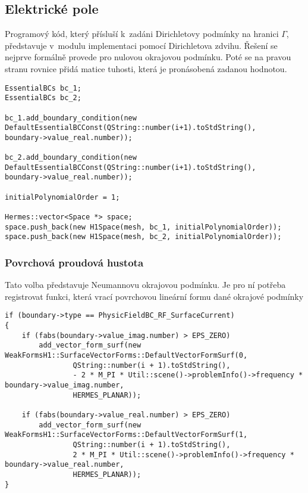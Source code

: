 \subsection*{Elektrické pole}
Programový kód, který přísluší k~zadáni Dirichletovy podmínky na hranici $\Gamma$, představuje v~modulu implementaci pomocí Dirichletova zdvihu.
Řešení se nejprve formálně provede pro nulovou okrajovou podmínku. Poté se na pravou stranu rovnice přidá matice tuhosti, která je pronásobená zadanou
hodnotou. 
\begin{verbatim}
EssentialBCs bc_1;
EssentialBCs bc_2;

bc_1.add_boundary_condition(new
DefaultEssentialBCConst(QString::number(i+1).toStdString(),
boundary->value_real.number));

bc_2.add_boundary_condition(new
DefaultEssentialBCConst(QString::number(i+1).toStdString(),
boundary->value_real.number));

initialPolynomialOrder = 1;

Hermes::vector<Space *> space;
space.push_back(new H1Space(mesh, bc_1, initialPolynomialOrder));
space.push_back(new H1Space(mesh, bc_2, initialPolynomialOrder));
\end{verbatim}

\subsubsection*{Povrchová proudová hustota}
Tato volba představuje Neumannovu okrajovou podmínku. Je pro ní potřeba registrovat funkci, která vrací povrchovou lineární formu dané okrajové podmínky
\begin{verbatim}
if (boundary->type == PhysicFieldBC_RF_SurfaceCurrent)
{
    if (fabs(boundary->value_imag.number) > EPS_ZERO)
        add_vector_form_surf(new WeakFormsH1::SurfaceVectorForms::DefaultVectorFormSurf(0,
                QString::number(i + 1).toStdString(),
                - 2 * M_PI * Util::scene()->problemInfo()->frequency * boundary->value_imag.number,
                HERMES_PLANAR));
                
    if (fabs(boundary->value_real.number) > EPS_ZERO)
        add_vector_form_surf(new WeakFormsH1::SurfaceVectorForms::DefaultVectorFormSurf(1,
                QString::number(i + 1).toStdString(),
                2 * M_PI * Util::scene()->problemInfo()->frequency * boundary->value_real.number,
                HERMES_PLANAR));
}
\end{verbatim}

